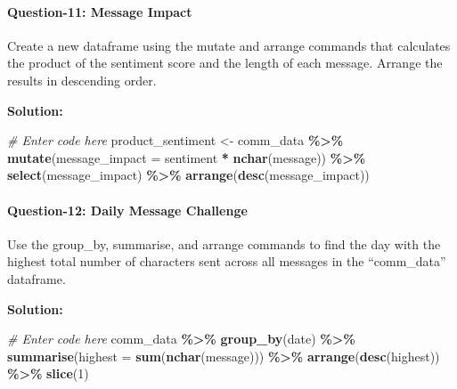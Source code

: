 \documentclass[
]{article}
\newenvironment{Shaded}{\begin{snugshade}}{\end{snugshade}}
\newcommand{\AttributeTok}[1]{\textcolor[rgb]{0.13,0.29,0.53}{#1}}
\newcommand{\CommentTok}[1]{\textcolor[rgb]{0.56,0.35,0.01}{\textit{#1}}}
\newcommand{\DecValTok}[1]{\textcolor[rgb]{0.00,0.00,0.81}{#1}}
\newcommand{\FunctionTok}[1]{\textcolor[rgb]{0.13,0.29,0.53}{\textbf{#1}}}
\newcommand{\NormalTok}[1]{#1}
\newcommand{\OtherTok}[1]{\textcolor[rgb]{0.56,0.35,0.01}{#1}}
\newcommand{\SpecialCharTok}[1]{\textcolor[rgb]{0.81,0.36,0.00}{\textbf{#1}}}
\begin{document}
\hypertarget{question-11-message-impact}{%
\paragraph{Question-11: Message
Impact}\label{question-11-message-impact}}

Create a new dataframe using the mutate and arrange commands that
calculates the product of the sentiment score and the length of each
message. Arrange the results in descending order.

\textbf{Solution:}

\begin{Shaded}
\begin{Highlighting}[]
\CommentTok{\# Enter code here}
\NormalTok{product\_sentiment }\OtherTok{\textless{}{-}}\NormalTok{ comm\_data }\SpecialCharTok{\%\textgreater{}\%}
  \FunctionTok{mutate}\NormalTok{(}\AttributeTok{message\_impact =}\NormalTok{ sentiment }\SpecialCharTok{*} \FunctionTok{nchar}\NormalTok{(message)) }\SpecialCharTok{\%\textgreater{}\%}
  \FunctionTok{select}\NormalTok{(message\_impact) }\SpecialCharTok{\%\textgreater{}\%}
  \FunctionTok{arrange}\NormalTok{(}\FunctionTok{desc}\NormalTok{(message\_impact))}
\end{Highlighting}
\end{Shaded}

\hypertarget{question-12-daily-message-challenge}{%
\paragraph{Question-12: Daily Message
Challenge}\label{question-12-daily-message-challenge}}

Use the group\_by, summarise, and arrange commands to find the day with
the highest total number of characters sent across all messages in the
``comm\_data'' dataframe.

\textbf{Solution:}

\begin{Shaded}
\begin{Highlighting}[]
\CommentTok{\# Enter code here}
\NormalTok{comm\_data }\SpecialCharTok{\%\textgreater{}\%} \FunctionTok{group\_by}\NormalTok{(date) }\SpecialCharTok{\%\textgreater{}\%} 
  \FunctionTok{summarise}\NormalTok{(}\AttributeTok{highest =} \FunctionTok{sum}\NormalTok{(}\FunctionTok{nchar}\NormalTok{(message))) }\SpecialCharTok{\%\textgreater{}\%}
  \FunctionTok{arrange}\NormalTok{(}\FunctionTok{desc}\NormalTok{(highest)) }\SpecialCharTok{\%\textgreater{}\%}
  \FunctionTok{slice}\NormalTok{(}\DecValTok{1}\NormalTok{)}
\end{Highlighting}
\end{Shaded}
\end{document}
